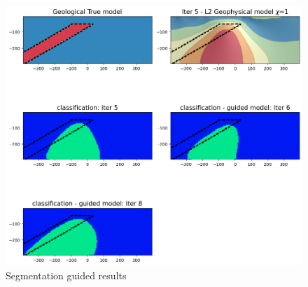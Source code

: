 \begin{figure}[htb]
    \vspace{-0.1cm}
    \begin{center}
    \includegraphics[width=\columnwidth]{figures/seg-guided-result.png}
    \end{center}
    \vspace{-0.5cm}
\caption{
    Segmentation guided results
}
\label{fig:boundbox}
\vspace{-0.1cm}
\end{figure}
